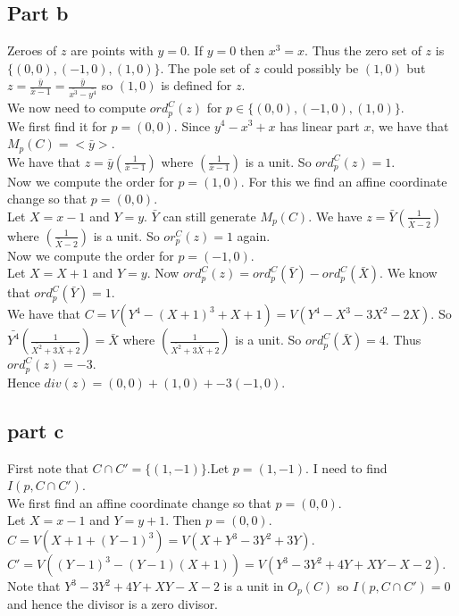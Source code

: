 \documentclass[12pt]{article}
\begin{document}
\subsection*{Part b}
Zeroes of $z$ are points with $y=0$. If $y=0$ then $x^3=x$. Thus the zero set of $z$ is $\{(0,0),(-1,0),(1,0)\}$. The pole set of $z$ could possibly be $(1,0)$ but
$z=\frac{\bar{y}}{\bar{x}-1}=\frac{\bar{y}}{\bar{x^3}-\bar{y^4}}$ so $(1,0)$ is defined for $z$.\\
We now need to compute $ord_p^C(z)$ for $p \in \{(0,0),(-1,0),(1,0)\}$. \\
We first find it for $p=(0,0)$.
Since $y^4-x^3+x$ has linear part $x$, we have that $M_p(C)=<\bar{y}>$. \\
We have that $z = \bar{y}(\frac{1}{\bar{x}-1})$ where $(\frac{1}{\bar{x}-1})$ is a unit. So $ord_p^C(z)=1$.\\
Now we compute the order for $p=(1,0)$. For this we find an affine coordinate change so that $p=(0,0)$. \\
Let $X=x-1$ and $Y=y$. $\bar{Y}$ can still generate $M_p(C)$.
We have $z=\bar{Y}(\frac{1}{\bar{X}-2})$ where $(\frac{1}{\bar{X}-2})$ is a unit.
So $or_p^C(z)=1$ again.\\
Now we compute the order for $p=(-1,0)$. \\
Let $X=X+1$ and $Y=y$. Now $ord_p^C(z)=ord_p^C(\bar{Y})-ord_p^C(\bar{X})$.
We know that $ord_p^C(\bar{Y})=1$. \\
We have that $C=V(Y^4-(X+1)^3+X+1)=V(Y^4-X^3-3X^2-2X)$.
So $\bar{Y^4}(\frac{1}{\bar{X^2}+3\bar{X}+2})=\bar{X}$ where
$(\frac{1}{\bar{X^2}+3\bar{X}+2})$ is a unit. So $ord_p^C(\bar{X})=4$. Thus
$ord_p^C(z)=-3$. \\
Hence $div(z)=(0,0)+(1,0)+-3(-1,0)$.
\subsection*{part c}
First note that $C \cap C'=\{(1,-1)\}$.Let $p=(1,-1)$. I need to find
$I(p,C \cap C')$.\\
We first find an affine coordinate change so that $p=(0,0)$. \\
Let $X=x-1$ and $Y=y+1$. Then $p=(0,0)$. \\
$C=V(X+1+(Y-1)^3)=V(X+Y^3-3Y^2+3Y)$.\\
$C'=V((Y-1)^3-(Y-1)(X+1))=V(Y^3-3Y^2+4Y+XY-X-2)$. \\
Note that $Y^3-3Y^2+4Y+XY-X-2$ is a unit in $O_p(C)$ so $I(p,C \cap C')=0$ and hence the divisor is a zero divisor.
\end{document}
